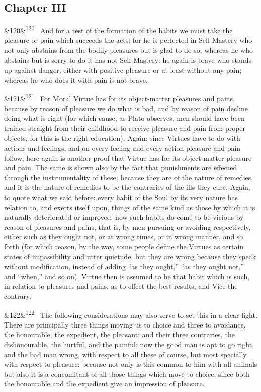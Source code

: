 \documentclass[12pt]{article}
\newcommand{\para}[1][]{\par\noindent\ifx&#1&\else\textsuperscript{\footnotesize #1}~\fi}
\begin{document}
\subsection*{Chapter III}

\para[120] And for a test of the formation of the habits we must take the pleasure or pain which succeeds the acts; for he is perfected in Self-Mastery who not only abstains from the bodily pleasures but is glad to do so; whereas he who abstains but is sorry to do it has not Self-Mastery: he again is brave who stands up against danger, either with positive pleasure or at least without any pain; whereas he who does it with pain is not brave.

\para[121] For Moral Virtue has for its object-matter pleasures and pains, because by reason of pleasure we do what is bad, and by reason of pain decline doing what is right (for which cause, as Plato observes, men should have been trained straight from their childhood to receive pleasure and pain from proper objects, for this is the right education). Again: since Virtues have to do with actions and feelings, and on every feeling and every action pleasure and pain follow, here again is another proof that Virtue has for its object-matter pleasure and pain. The same is shown also by the fact that punishments are effected through the instrumentality of these; because they are of the nature of remedies, and it is the nature of remedies to be the contraries of the ills they cure. Again, to quote what we said before: every habit of the Soul by its very nature has relation to, and exerts itself upon, things of the same kind as those by which it is naturally deteriorated or improved: now such habits do come to be vicious by reason of pleasures and pains, that is, by men pursuing or avoiding respectively, either such as they ought not, or at wrong times, or in wrong manner, and so forth (for which reason, by the way, some people define the Virtues as certain states of impassibility and utter quietude, but they are wrong because they speak without modification, instead of adding “as they ought,” “as they ought not,” and “when,” and so on). Virtue then is assumed to be that habit which is such, in relation to pleasures and pains, as to effect the best results, and Vice the contrary.

\para[122] The following considerations may also serve to set this in a clear light. There are principally three things moving us to choice and three to avoidance, the honourable, the expedient, the pleasant; and their three contraries, the dishonourable, the hurtful, and the painful: now the good man is apt to go right, and the bad man wrong, with respect to all these of course, but most specially with respect to pleasure: because not only is this common to him with all animals but also it is a concomitant of all those things which move to choice, since both the honourable and the expedient give an impression of pleasure.
\end{document}
